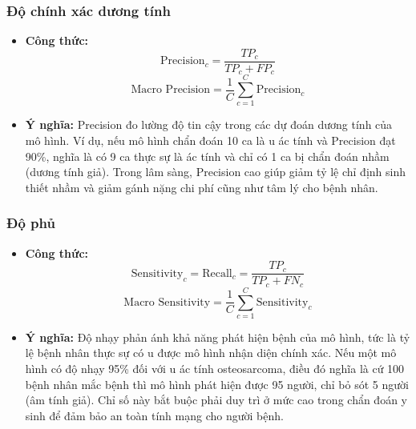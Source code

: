 \subsubsection{Độ chính xác dương tính}
\begin{itemize}
    \item \textbf{Công thức:}
    \begin{equation}
        \text{Precision}_c = \frac{TP_c}{TP_c + FP_c}
    \end{equation}
    \begin{equation}
        \text{Macro Precision} = \frac{1}{C} \sum_{c=1}^{C} \text{Precision}_c
    \end{equation}
    \item \textbf{Ý nghĩa:} Precision đo lường độ tin cậy trong các dự đoán dương tính của mô hình. Ví dụ, nếu mô hình chẩn đoán 10 ca là u ác tính và Precision đạt 90\%, nghĩa là có 9 ca thực sự là ác tính và chỉ có 1 ca bị chẩn đoán nhầm (dương tính giả). Trong lâm sàng, Precision cao giúp giảm tỷ lệ chỉ định sinh thiết nhầm và giảm gánh nặng chi phí cũng như tâm lý cho bệnh nhân.
\end{itemize}

\subsubsection{Độ phủ}
\begin{itemize}
    \item \textbf{Công thức:}
    \begin{equation}
        \text{Sensitivity}_c = \text{Recall}_c = \frac{TP_c}{TP_c + FN_c}
    \end{equation}
    \begin{equation}
        \text{Macro Sensitivity} = \frac{1}{C} \sum_{c=1}^{C} \text{Sensitivity}_c
    \end{equation}
    \item \textbf{Ý nghĩa:} Độ nhạy phản ánh khả năng phát hiện bệnh của mô hình, tức là tỷ lệ bệnh nhân thực sự có u được mô hình nhận diện chính xác. Nếu một mô hình có độ nhạy 95\% đối với u ác tính osteosarcoma, điều đó nghĩa là cứ 100 bệnh nhân mắc bệnh thì mô hình phát hiện được 95 người, chỉ bỏ sót 5 người (âm tính giả). Chỉ số này bắt buộc phải duy trì ở mức cao trong chẩn đoán y sinh để đảm bảo an toàn tính mạng cho người bệnh.
\end{itemize}

